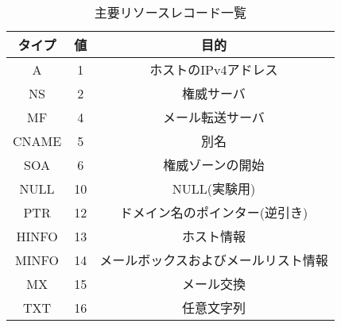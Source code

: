 \begin{table}[htb]
 \centering
  \begin{tabular}{ccc}
    \toprule
    タイプ & 値 & 目的 \\
    \midrule
    A & 1 &  ホストのIPv4アドレス \\
    NS & 2 & 権威サーバ \\
    MF & 4 & メール転送サーバ \\
    CNAME & 5 & 別名 \\
    SOA & 6 & 権威ゾーンの開始 \\
    NULL & 10 & NULL(実験用) \\
    PTR & 12 & ドメイン名のポインター(逆引き) \\
    HINFO & 13 & ホスト情報 \\
    MINFO & 14 & メールボックスおよびメールリスト情報 \\
    MX & 15 & メール交換 \\
    TXT & 16 & 任意文字列 \\
    \bottomrule
  \end{tabular}
 \caption{主要リソースレコード一覧}
 \label{tab:resource-record}
\end{table}
